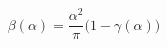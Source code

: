 \begin{equation}\label{NSVZ_Beta}
\beta(\alpha) = \frac{\alpha^2}{\pi}\Big(1-\gamma(\alpha)\Big)
\end{equation}

